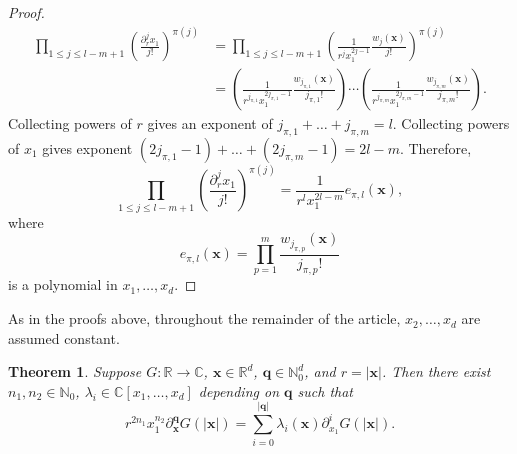 \documentclass[12pt]{article}
\newtheorem{theorem}{Theorem}
\def\C{{\mathbb C}}
\def\N{{\mathbb N}}
\def\R{{\mathbb R}}
\let\b=\boldsymbol
\theoremstyle{definition}
\theoremstyle{plain}
\theoremstyle{definition}
\begin{document}
\begin{proof}
\begin{align*}
 \prod_{1 \leq j \leq l-m+1} \left( \frac{\partial^j_r x_1}{j!} \right)^{\pi(j)}
&=  \prod_{1 \leq j \leq l-m+1} \left( \frac{1}{r^j x_1^{2j-1}} \frac{w_{j}(\b{x})}{j!} \right)^{\pi(j)}\\
&= \left( \frac{1}{r^{j_{\pi,1}} x_1^{2j_{\pi,1}-1}} \frac{w_{j_{\pi,1}}(\b{x})}{j_{\pi,1}!} \right) \cdots
 \left( \frac{1}{r^{j_{\pi,m}} x_1^{2j_{\pi,m}-1}} \frac{w_{j_{\pi,m}}(\b{x})}{j_{\pi,m}!} \right).
\end{align*}
Collecting powers of $r$ gives an exponent of $j_{\pi,1} + \dots + j_{\pi,m} = l$. Collecting powers of $x_1$ gives exponent $(2j_{\pi,1}-1) + \dots + (2j_{\pi,m}-1) = 2l - m$. Therefore,
\begin{equation}
\label{eq:partialjrprodsimp}
\prod_{1 \leq j \leq l-m+1} \left( \frac{\partial^j_r x_1}{j!} \right)^{\pi(j)} = \frac{1}{r^l x_1^{2l-m}}  e_{\pi,l}(\b{x}),
\end{equation}
where
\[e_{\pi,l}(\b{x}) = \prod_{p=1}^{m} \frac{w_{j_{\pi,p}}(\b{x})}{j_{\pi,p}!}\]
is a polynomial in $x_1, \dots, x_d$.
\end{proof}

As in the proofs above, throughout the remainder of the article, $x_2, \dots, x_d$
are assumed constant.

\begin{theorem}
\label{thm:pdeetoode}
Suppose $G : \R \to \C$, $\b{x} \in \R^d$, $\b q\in \N_0^d$, and $r = |\b{x}|$. Then there exist $n_1, n_2 \in \N_0$, $\lambda_i \in \C[x_1, \dots, x_d]$ depending on $\b q$ such that
\begin{equation}
\label{eq:normalization:factor}
r^{2n_1} x_1^{n_2} \partial^{\b{q}}_{\b{x}} G(|\b{x}|) = \sum_{i=0}^{|\b{q}|} \lambda_i(\b{x})\partial^i_{x_1} G(|\b{x}|).
\end{equation}
\end{theorem}
\end{document}
